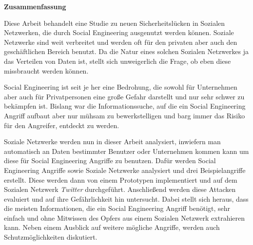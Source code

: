 
\clearemptydoublepage
{}
{}


\vspace*{2cm}
\begin{center}
{\Large \bf Zusammenfassung}
\end{center}
\vspace{1cm}

Diese Arbeit behandelt eine Studie zu neuen Sicherheitslücken in Sozialen
Netzwerken, die durch Social Engineering ausgenutzt werden können. Soziale
Netzwerke sind weit verbreitet und werden oft für den privaten aber auch den
geschäftlichen Bereich benutzt. Da die Natur eines solchen Sozialen Netzwerkes
ja das Verteilen von Daten ist, stellt sich unweigerlich die Frage, ob eben
diese missbraucht werden können.

Social Engineering ist seit je her eine Bedrohung, die sowohl für Unternehmen
aber auch für Privatpersonen eine große Gefahr darstellt und nur sehr schwer zu
bekämpfen ist. Bislang war die Informationssuche, auf die ein Social
Engineering Angriff aufbaut aber nur mühsam zu bewerkstelligen und barg immer
das Risiko für den Angreifer, entdeckt zu werden.

Soziale Netzwerke werden nun in dieser Arbeit analysiert, inwiefern man
automatisch an Daten bestimmter Benutzer oder Unternehmen kommen kann um diese für
Social Engineering Angriffe zu benutzen. Dafür werden Social Engineering
Angriffe sowie Soziale Netzwerke analysiert und drei Beispielangriffe erstellt.
Diese werden dann von einem Prototypen implementiert und auf dem Sozialen
Netzwerk \textit{Twitter} durchgeführt. Anschließend werden diese Attacken
evaluiert und auf ihre Gefährlichkeit hin untersucht. Dabei stellt sich heraus,
dass die meisten Informationen, die ein Social Engineering Angriff benötigt,
sehr einfach und ohne Mitwissen des Opfers aus einem Sozialen Netzwerk
extrahieren kann. Neben einem Ausblick auf weitere mögliche Angriffe, werden
auch Schutzmöglichkeiten diskutiert.

